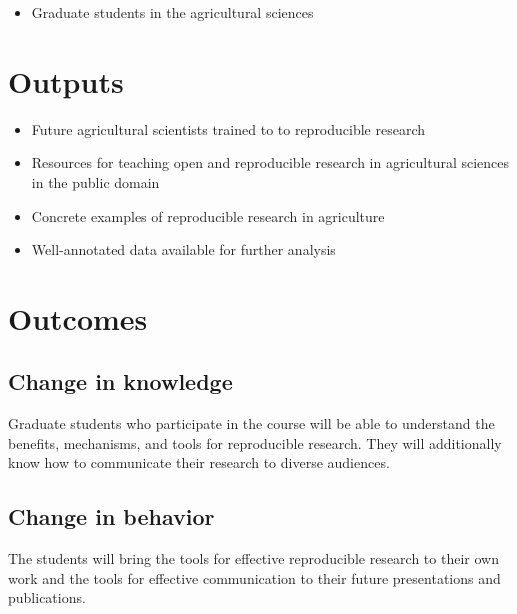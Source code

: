 \documentclass[12pt,letterpaper]{article}
\begin{document}
\begin{itemize}
	\item Graduate students in the agricultural sciences
\end{itemize}

\section{Outputs}

\begin{itemize}
	\item Future agricultural scientists trained to to reproducible research
	\item Resources for teaching open and reproducible research in agricultural sciences in the public domain
	\item Concrete examples of reproducible research in agriculture
	\item Well-annotated data available for further analysis
\end{itemize}

\section{Outcomes}


\subsection{Change in knowledge}

Graduate students who participate in the course will be able to understand the benefits, mechanisms, and tools for reproducible research. They will additionally know how to communicate their research to diverse audiences.


\subsection{Change in behavior}

The students will bring the tools for effective reproducible research to their own work and the tools for effective communication to their future presentations and publications. 
\end{document}

